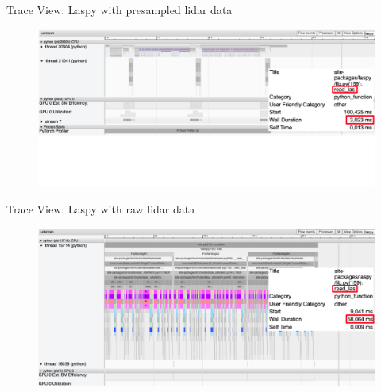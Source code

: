 \documentclass[compress,aspectratio=169]{beamer}
\begin{document}
\begin{frame}{Trace View: Laspy with presampled lidar data}
    \vspace{-1em}
\begin{center}
    \begin{figure}
        \includegraphics[width=1\textwidth]{../../data/scap_gtx1080_profiler-torch_batch-size-64_14650758_trace-view-laspy}
    \end{figure}
    \end{center}
\end{frame}

\begin{frame}{Trace View: Laspy with raw lidar data}
    \vspace{-1em}
\begin{center}
    \begin{figure}
        \includegraphics[width=1\textwidth]{../../data/scap_gtx1080_profiler-torch_sample-points_14650750_trace-view-laspy}
    \end{figure}
    \end{center}
\end{frame}
\end{document}
